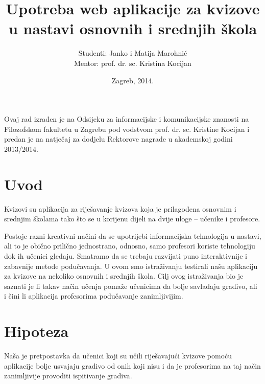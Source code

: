 \documentclass{scrreprt}
\begin{document}
\titlehead{Sveučilište u Zagrebu\\Filozofski fakultet\\Odsijek za informacijske
i komunikacijske znanosti\\Akademska godina 2013/14.}
\title{Upotreba web aplikacije za kvizove u nastavi osnovnih i srednjih škola}
\author{Studenti: Janko i Matija Marohnić\\Mentor: prof. dr. sc. Kristina
Kocijan}
\date{Zagreb, 2014.}

\maketitle

\pagebreak

Ovaj rad izrađen je na Odsijeku za informacijske i komunikacijske znanosti na
Filozofskom fakultetu u Zagrebu pod vodstvom prof. dr. sc. Kristine Kocijan i
predan je na natječaj za dodjelu Rektorove nagrade u akademskoj godini
2013/2014.

\pagebreak

\tableofcontents

\chapter{Uvod}

Kvizovi su aplikacija za riješavanje kvizova koja je prilagođena osnovnim i
srednjim školama tako što se u korijenu dijeli na dvije uloge -- učenike i
profesore.

Postoje razni kreativni načini da se upotrijebi informacijska tehnologija u
nastavi, ali to je obično prilično jednostrano, odnosno, samo profesori koriste
tehnologiju dok ih učenici gledaju. Smatramo da se trebaju razvijati puno
interaktivnije i zabavnije metode podučavanja. U ovom smo istraživanju testirali
našu aplikaciju za kvizove na nekoliko osnovnih i srednjih škola. Cilj ovog
istraživanja bio je saznati je li takav način učenja pomaže učenicima da bolje
savladaju gradivo, ali i čini li aplikacija profesorima podučavanje
zanimljivijim.

\chapter{Hipoteza}

Naša je pretpostavka da učenici koji su učili riješavajući kvizove pomoću
aplikacije bolje usvajaju gradivo od onih koji nisu i da je profesorima na taj
način zanimljivije provoditi ispitivanje gradiva.
\end{document}
